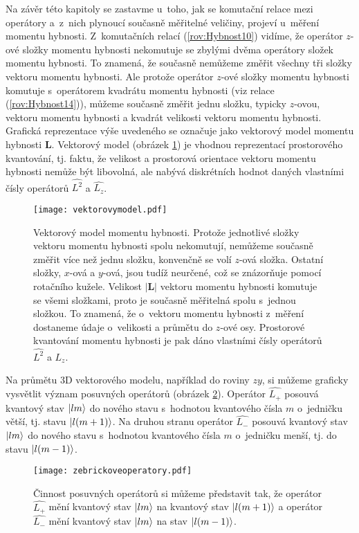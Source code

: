 Na závěr této kapitoly se zastavme u~toho, jak se komutační relace mezi operátory a~z~nich plynoucí současně měřitelné veličiny, projeví u~měření momentu hybnosti. Z~komutačních relací (\ref{rov:Hybnost10}) vidíme, že operátor $z$-ové složky momentu hybnosti nekomutuje se zbylými dvěma operátory složek momentu hybnosti. To znamená, že současně nemůžeme změřit všechny tři složky vektoru momentu hybnosti. Ale protože operátor $z$-ové složky momentu hybnosti komutuje s~operátorem kvadrátu momentu hybnosti (viz relace (\ref{rov:Hybnost14})), můžeme současně změřit  jednu složku, typicky $z$-ovou, vektoru momentu hybnosti a kvadrát velikosti vektoru momentu hybnosti. Grafická reprezentace výše uvedeného se označuje jako vektorový model momentu hybnosti $\mathbf{L}$. Vektorový model (obrázek \ref{obr:VektorovyModel}) je vhodnou reprezentací prostorového kvantování, tj. faktu, že velikost a prostorová orientace vektoru momentu hybnosti nemůže být libovolná, ale nabývá diskrétních hodnot daných vlastními čísly operátorů $\hat{L^2}$ a $\hat{L_z}$.
\begin{figure} [!ht]
\centering
\texttt{[image: vektorovymodel.pdf]}
\caption[Vektorový model momentu hybnosti]{Vektorový model momentu hybnosti. Protože jednotlivé složky vektoru momentu hybnosti spolu nekomutují, nemůžeme současně změřit více než jednu složku, konvenčně se volí $z$-ová složka. Ostatní složky, $x$-ová a $y$-ová, jsou tudíž neurčené, což se znázorňuje pomocí rotačního kužele. Velikost $|\mathbf{L}|$ vektoru momentu hybnosti komutuje se všemi složkami, proto je současně měřitelná spolu s~jednou složkou. To znamená, že o~vektoru momentu hybnosti z~měření dostaneme údaje o~velikosti a průmětu do $z$-ové osy. Prostorové kvantování momentu hybnosti je pak dáno vlastními čísly operátorů $\hat{L^2}$ a $\hat{L_z}$.}
\label{obr:VektorovyModel}
\end{figure}

Na průmětu 3D vektorového modelu, například do roviny $zy$, si můžeme graficky vysvětlit význam posuvných operátorů (obrázek \ref{obr:ZebrickoveOperatory}). Operátor $\hat{L_+}$ posouvá kvantový stav $\ket{lm}$ do nového stavu s~hodnotou kvantového čísla $m$ o~jedničku větší, tj. stavu $\ket{l(m+1)}$. Na druhou stranu operátor  $\hat{L_-}$ posouvá kvantový stav $\ket{lm}$ do nového stavu s~hodnotou kvantového čísla $m$ o~jedničku menší, tj. do stavu $\ket{l(m-1)}$.
\begin{figure} [!ht]
\centering
\texttt{[image: zebrickoveoperatory.pdf]}
\caption[Posuvné operátory ve vektorovém modelu]{Činnost posuvných operátorů si můžeme představit tak, že operátor $\hat{L_+}$ mění kvantový stav $\ket{lm}$ na kvantový stav $\ket{l(m+1)}$ a operátor $\hat{L_-}$ mění kvantový stav $\ket{lm}$ na stav $\ket{l(m-1)}$.}
\label{obr:ZebrickoveOperatory}
\end{figure}

